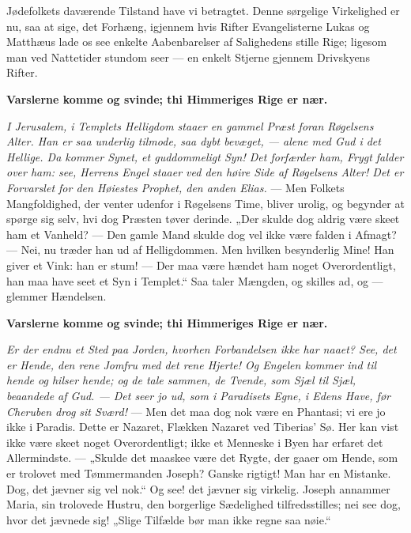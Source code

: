 \documentclass[12pt,a4paper]{book}
\begin{document}
Jødefolkets daværende Tilstand have vi betragtet. Denne sørgelige Virkelighed er
nu, saa at sige, det Forhæng, igjennem hvis Rifter Evangelisterne Lukas og
Matthæus lade os see enkelte Aabenbarelser af Salighedens stille Rige; ligesom
man ved Nattetider stundom seer --- en enkelt Stjerne gjennem Drivskyens Rifter.

\textbf{Varslerne komme og svinde; thi Himmeriges Rige er nær.}

\emph{I Jerusalem, i Templets Helligdom staaer en gammel Præst foran Røgelsens
Alter. Han er saa underlig tilmode, saa dybt bevæget, --- alene med Gud i det
Hellige. Da kommer Synet, et guddommeligt Syn! Det forfærder ham, Frygt falder
over ham: see, Herrens Engel staaer ved den høire Side af Røgelsens Alter! Det
er Forvarslet for den Høiestes Prophet, den anden Elias.} --- Men Folkets
Mangfoldighed, der venter udenfor i Røgelsens Time, bliver urolig, og begynder
at spørge sig selv, hvi dog Præsten tøver derinde. „Der skulde dog aldrig være
skeet ham et Vanheld? --- Den gamle Mand skulde dog vel ikke være falden i
Afmagt? --- Nei, nu træder han ud af Helligdommen. Men hvilken besynderlig Mine!
Han giver et Vink: han er stum! --- Der maa være hændet ham noget
Overordentligt, han maa have seet et Syn i Templet.“ Saa taler Mængden, og
skilles ad, og --- glemmer Hændelsen.

\textbf{Varslerne komme og svinde; thi Himmeriges Rige er nær.}

\emph{Er der endnu et Sted paa Jorden, hvorhen Forbandelsen ikke har naaet? See,
det er Hende, den rene Jomfru med det rene Hjerte! Og Engelen kommer ind til
hende og hilser hende; og de tale sammen, de Tvende, som Sjæl til Sjæl,
beaandede af Gud. --- Det seer jo ud, som i Paradisets Egne, i Edens Have, før
Cheruben drog sit Sværd!} --- Men det maa dog nok være en Phantasi; vi ere jo
ikke i Paradis. Dette er Nazaret, Flækken Nazaret ved Tiberias' Sø.
Her kan vist ikke være skeet noget Overordentligt; ikke et Menneske i Byen har
erfaret det Allermindste. --- „Skulde det maaskee være det Rygte, der gaaer om
Hende, som er trolovet med Tømmermanden Joseph? Ganske rigtigt! Man har en
Mistanke. Dog, det jævner sig vel nok.“ Og see! det jævner sig virkelig. Joseph
annammer Maria, sin trolovede Hustru, den borgerlige Sædelighed tilfredsstilles;
nei see dog, hvor det jævnede sig! „Slige Tilfælde bør man ikke regne saa nøie.“
\end{document}
